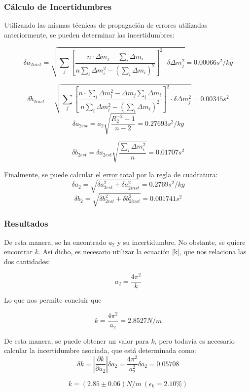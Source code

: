 \documentclass[a4paper,12pt]{article}
\begin{document}
\subsubsection{Cálculo de Incertidumbres}
Utilizando las mismas técnicas de propagación de errores utilizadas anteriormente, se pueden 
determinar las incertidumbres:

  $$\delta a_{2inst} = \sqrt{\sum_j\left[ \frac{n\cdot\Delta m_j - \sum_i\Delta m_i}{n\sum_i \Delta m_i^2-\left(  \sum_i  \Delta m_i\right)^2} \right]^2 \cdot \delta \Delta m_j^2} = 0.00066 s^2/kg$$ 

  $$\delta b_{2inst} =\sqrt{\sum_j\left[ \frac{n\cdot\sum_i \Delta m_i^2 -\Delta m_j \sum_i \Delta m_i}{n\sum_i \Delta m_i^2-\left(  \sum_i  \Delta m_i\right)^2} \right]^2 \cdot \delta \Delta m_j^2} = 0.00345 s^2
$$
  $$\delta a_{2est }= a_2\sqrt{\frac{R_2^{-2}-1}{n-2}} =0.27693 s^2/kg$$
  
  $$\delta b_{2est} = \delta a_{2est}\sqrt{\frac{\sum_i\Delta m_i^2}{n}} = 0.01707 s^2$$

Finalmente, se puede calcular el error total por la regla de cuadratura:
$$\delta a_2 = \sqrt{\delta a_{2est}^2 + \delta a_{2inst}^2} = 0.2769 s^2/kg
$$$$\delta b_2 = \sqrt{\delta b_{2est}^2 + \delta b_{2inst}^2} = 0.001741 s^2$$

\subsubsection{Resultados}
De esta manera, se ha encontrado $a_2$ y su incertidumbre. No obstante, se quiere encontrar $k$.
Así dicho, es necesario utilizar la ecuación \eqref{k}, que nos relaciona las dos cantidades:

$$a_2 = \frac{4\pi^2}{k}$$

Lo que nos permite concluir que

$$k = \frac{4\pi^2}{a_2}=2.8527 N/m$$

De esta manera, se puede obtener un valor para $k$, pero todavía es necesario calcular 
la incertidumbre asociada, que está determinada como: 
$$\delta k =\left|\frac{\partial k}{\partial a_2}\right| \delta a_2 = \frac{4\pi^2}{a_2^2} \delta a_2 = 0.05708$$


\begin{tcolorbox}
    \begin{equation}
      k = (2.85 \pm 0.06) N/m \ (\epsilon_k=2.10\%)
      \label{a2}
    \end{equation}
\end{tcolorbox}
\end{document}

